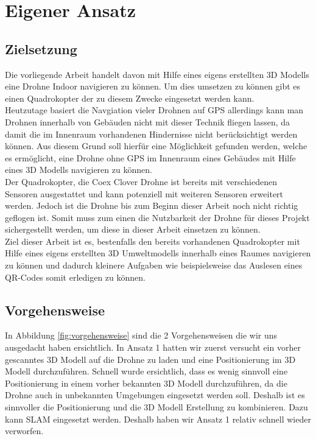 \chapter{Eigener Ansatz}

\section{Zielsetzung}
Die vorliegende Arbeit handelt davon mit Hilfe eines eigens erstellten 3D Modells eine Drohne Indoor navigieren zu können. Um dies umsetzen zu können gibt es einen Quadrokopter der zu diesem Zwecke eingesetzt werden kann. \\
Heutzutage basiert die Navgiation vieler Drohnen auf \ac{GPS} allerdings kann man Drohnen innerhalb von Gebäuden nicht mit dieser Technik fliegen lassen, da damit die im Innenraum vorhandenen Hindernisse nicht berücksichtigt werden können. Aus diesem Grund soll hierfür eine Möglichkeit gefunden werden, welche es ermöglicht, eine Drohne ohne \ac{GPS} im Innenraum eines Gebäudes mit Hilfe eines 3D Modells navigieren zu können.\\
Der Quadrokopter, die Coex Clover Drohne ist bereits mit verschiedenen Sensoren ausgestattet und kann potenziell mit weiteren Sensoren erweitert werden. Jedoch ist die Drohne bis zum Beginn dieser Arbeit noch nicht richtig geflogen ist. Somit muss zum einen die Nutzbarkeit der Drohne für dieses Projekt sichergestellt werden, um diese in dieser Arbeit einsetzen zu können. \\
Ziel dieser Arbeit ist es, bestenfalls den bereits vorhandenen Quadrokopter mit Hilfe eines eigens erstellten 3D Umweltmodells innerhalb eines Raumes navigieren zu können und dadurch kleinere Aufgaben wie beispielsweise das Auslesen eines QR-Codes somit erledigen zu können.



\section{Vorgehensweise}

In Abbildung \ref{fig:vorgehensweise} sind die 2 Vorgehensweisen die wir uns ausgedacht haben ersichtlich. In Ansatz 1 hatten wir zuerst versucht ein vorher gescanntes 3D Modell auf die Drohne zu laden und eine Positionierung im 3D Modell durchzuführen. Schnell wurde ersichtlich, dass es wenig sinnvoll eine Positionierung in einem vorher bekannten 3D Modell durchzuführen, da die Drohne auch in unbekannten Umgebungen eingesetzt werden soll. Deshalb ist es sinnvoller die Positionierung und die 3D Modell Erstellung zu kombinieren. Dazu kann \ac{SLAM} eingesetzt werden. Deshalb haben wir Ansatz 1 relativ schnell wieder verworfen.

